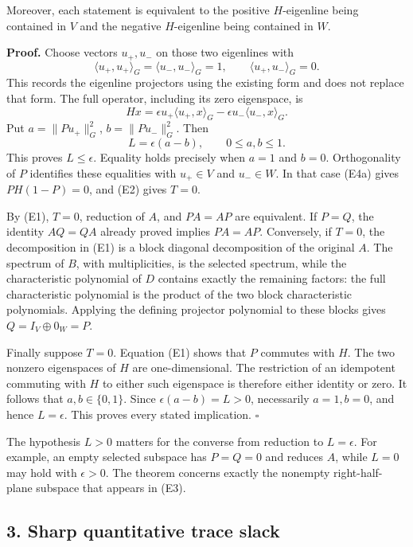 Moreover, each statement is equivalent to the positive \(H\)-eigenline being contained in \(V\) and the negative \(H\)-eigenline being contained in \(W\).

\textbf{Proof.} Choose vectors \(u_+,u_-\) on those two eigenlines with
\[
\langle u_+,u_+\rangle_G=\langle u_-,u_-\rangle_G=1,
\qquad \langle u_+,u_-\rangle_G=0.
\]
This records the eigenline projectors using the existing form and does not replace that form. The full operator, including its zero eigenspace, is
\[
Hx=\epsilon u_+\langle u_+,x\rangle_G-
\epsilon u_-\langle u_-,x\rangle_G.
\tag{E4a}
\]
Put \(a=\|Pu_+\|_G^2\), \(b=\|Pu_-\|_G^2\). Then
\[
L=\epsilon(a-b),\qquad 0\leq a,b\leq1.
\tag{E4b}
\]
This proves \(L\leq\epsilon\). Equality holds precisely when \(a=1\) and \(b=0\). Orthogonality of \(P\) identifies these equalities with \(u_+\in V\) and \(u_-\in W\). In that case (E4a) gives \(PH(1-P)=0\), and (E2) gives \(T=0\).

By (E1), \(T=0\), reduction of \(A\), and \(PA=AP\) are equivalent. If \(P=Q\), the identity \(AQ=QA\) already proved implies \(PA=AP\). Conversely, if \(T=0\), the decomposition in (E1) is a block diagonal decomposition of the original \(A\). The spectrum of \(B\), with multiplicities, is the selected spectrum, while the characteristic polynomial of \(D\) contains exactly the remaining factors: the full characteristic polynomial is the product of the two block characteristic polynomials. Applying the defining projector polynomial to these blocks gives \(Q=I_V\oplus0_W=P\).

Finally suppose \(T=0\). Equation (E1) shows that \(P\) commutes with \(H\). The two nonzero eigenspaces of \(H\) are one-dimensional. The restriction of an idempotent commuting with \(H\) to either such eigenspace is therefore either identity or zero. It follows that \(a,b\in\{0,1\}\). Since \(\epsilon(a-b)=L>0\), necessarily \(a=1,b=0\), and hence \(L=\epsilon\). This proves every stated implication. \(\square\)

The hypothesis \(L>0\) matters for the converse from reduction to \(L=\epsilon\). For example, an empty selected subspace has \(P=Q=0\) and reduces \(A\), while \(L=0\) may hold with \(\epsilon>0\). The theorem concerns exactly the nonempty right-half-plane subspace that appears in (E3).

\subsection{3. Sharp quantitative trace slack}\label{sharp-quantitative-trace-slack}


